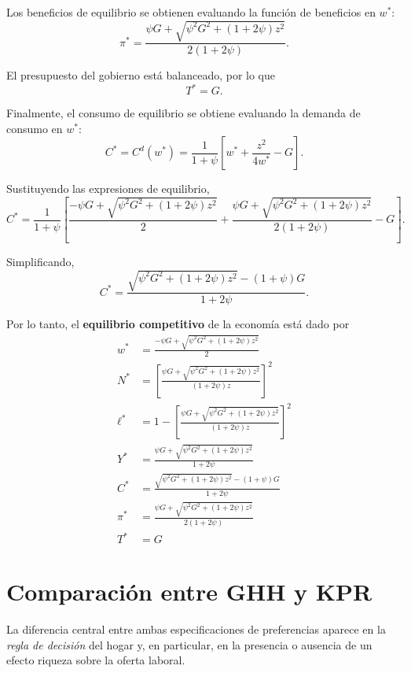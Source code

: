 \documentclass[11pt]{article}
\begin{document}
Los beneficios de equilibrio se obtienen evaluando la función de beneficios en $w^*$:
\[
\boxed{
\pi^*
=
\frac{
\psi G+
\sqrt{
\psi^2G^2+(1+2\psi)z^2
}
}{
2(1+2\psi)
}
}.
\]

El presupuesto del gobierno está balanceado, por lo que
\[
\boxed{
T^*=G
}.
\]

Finalmente, el consumo de equilibrio se obtiene evaluando la demanda de consumo
en $w^*$:
\[
C^*
=
C^d(w^*)
=
\frac{1}{1+\psi}
\left[
w^*
+
\frac{z^2}{4w^*}
-G
\right].
\]

Sustituyendo las expresiones de equilibrio,
\[
C^*
=
\frac{1}{1+\psi}
\left[
\frac{
-\psi G+
\sqrt{
\psi^2G^2+(1+2\psi)z^2
}
}{2}
+
\frac{
\psi G+
\sqrt{
\psi^2G^2+(1+2\psi)z^2
}
}{
2(1+2\psi)
}
-G
\right].
\]

Simplificando,
\[
\boxed{
C^*
=
\frac{
\sqrt{
\psi^2G^2+(1+2\psi)z^2
}
-(1+\psi)G
}{
1+2\psi
}
}.
\]

Por lo tanto, el \textbf{equilibrio competitivo} de la economía está dado por
\[
\boxed{
\begin{aligned}
w^*
&=
\frac{
-\psi G+
\sqrt{
\psi^2G^2+(1+2\psi)z^2
}
}{2}
\\[0.8em]
N^*
&=
\left[
\frac{
\psi G+
\sqrt{
\psi^2G^2+(1+2\psi)z^2
}
}{
(1+2\psi)z
}
\right]^2
\\[0.8em]
\ell^*
&=
1-
\left[
\frac{
\psi G+
\sqrt{
\psi^2G^2+(1+2\psi)z^2
}
}{
(1+2\psi)z
}
\right]^2
\\[0.8em]
Y^*
&=
\frac{
\psi G+
\sqrt{
\psi^2G^2+(1+2\psi)z^2
}
}{
1+2\psi
}
\\[0.8em]
C^*
&=
\frac{
\sqrt{
\psi^2G^2+(1+2\psi)z^2
}
-(1+\psi)G
}{
1+2\psi
}
\\[0.8em]
\pi^*
&=
\frac{
\psi G+
\sqrt{
\psi^2G^2+(1+2\psi)z^2
}
}{
2(1+2\psi)
}
\\[0.8em]
T^*
&=G
\end{aligned}
}
\]




\section{Comparación entre GHH y KPR}

La diferencia central entre ambas especificaciones de preferencias aparece en la \textit{regla de decisión} del hogar y, en particular, en la presencia o ausencia de un efecto riqueza sobre la oferta laboral.
\end{document}
